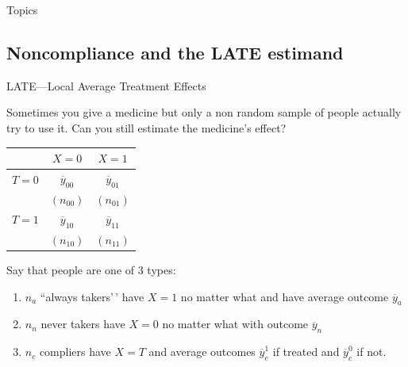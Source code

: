 \documentclass[
  11pt,
  ignorenonframetext,
]{beamer}
\providecommand{\tightlist}{%
  \setlength{\itemsep}{0pt}\setlength{\parskip}{0pt}}\usepackage{longtable,booktabs,array}
\begin{document}
\begin{frame}{Topics}
\hyperlink{ideas}{}
\end{frame}

\hypertarget{noncompliance-and-the-late-estimand}{%
\subsection{\texorpdfstring{Noncompliance and the LATE estimand
\label{LATE}}{Noncompliance and the LATE estimand }}\label{noncompliance-and-the-late-estimand}}

\begin{frame}{LATE---Local Average Treatment Effects}
\protect\hypertarget{latelocal-average-treatment-effects}{}
\footnotesize

Sometimes you give a medicine but only a non random sample of people
actually try to use it. Can you still estimate the medicine's effect?

\begin{table}
    \scriptsize
    \centering
        \begin{tabular}{l|cc}
        &$X=0$&$X=1$\\ \hline
        $T=0$& $\overline{y}_{00}$ & $\overline{y}_{01}$ \\
           & $(n_{00})$ & $(n_{01})$\\ \hline
        $T=1$& $\overline{y}_{10}$ & $\overline{y}_{11}$ \\ 
               & $(n_{10})$ & $(n_{11})$\\ \hline
        \end{tabular}
\end{table}

Say that people are one of 3 types:

\begin{enumerate}
\tightlist
\item
  \(n_a\) ``always takers'\,' have \(X=1\) no matter what and have
  average outcome \(\overline{y}_a\)
\item
  \(n_n\) never takers have \(X=0\) no matter what with outcome
  \(\overline{y}_n\)
\item
  \(n_c\) compliers have \(X=T\) and average outcomes
  \(\overline{y}^1_c\) if treated and \(\overline{y}^0_c\) if not.
\end{enumerate}
\end{frame}
\end{document}
